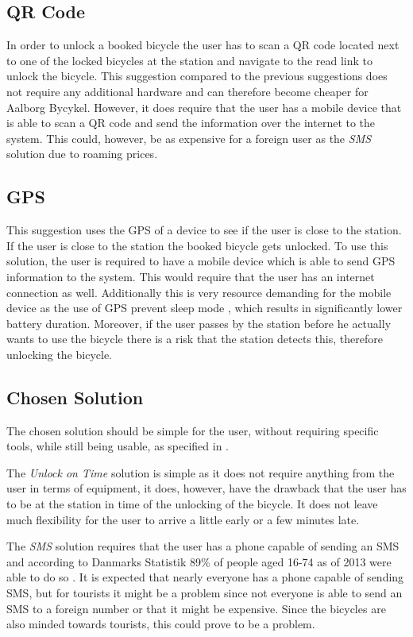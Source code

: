 \subsection{QR Code}
In order to unlock a booked bicycle the user has to scan a QR code located next to one of the locked bicycles at the station and navigate to the read link to unlock the bicycle.
This suggestion compared to the previous suggestions does not require any additional hardware and can therefore become cheaper for Aalborg Bycykel.
However, it does require that the user has a mobile device that is able to scan a QR code and send the information over the internet to the system. This could, however, be as expensive for a foreign user as the \textit{SMS} solution due to roaming prices.

\subsection{GPS}
This suggestion uses the GPS of a device to see if the user is close to the station.
If the user is close to the station the booked bicycle gets unlocked.
To use this solution, the user is required to have a mobile device which is able to send GPS information to the system.
This would require that the user has an internet connection as well.
Additionally this is very resource demanding for the mobile device as the use of GPS prevent sleep mode \citep{misc:gpsbatteryusage}, which results in significantly lower battery duration.
Moreover, if the user passes by the station before he actually wants to use the bicycle there is a risk that the station detects this, therefore unlocking the bicycle.

\subsection{Chosen Solution}
The chosen solution should be simple for the user, without requiring specific tools, while still being usable, as specified in .

The \textit{Unlock on Time} solution is simple as it does not require anything from the user in terms of equipment, it does, however, have the drawback that the user has to be at the station in time of the unlocking of the bicycle.
It does not leave much flexibility for the user to arrive a little early or a few minutes late.

The \textit{SMS} solution requires that the user has a phone capable of sending an SMS and according to Danmarks Statistik 89\% of people aged 16-74 as of 2013 were able to do so \citep{misc:dstMobilephone}.
It is expected that nearly everyone has a phone capable of sending SMS, but for tourists it might be a problem since not everyone is able to send an SMS to a foreign number or that it might be expensive.
Since the bicycles are also minded towards tourists, this could prove to be a problem.

